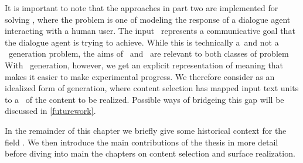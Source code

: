 It is important to note that the approaches in part two are implemented
for solving \taskorienteddialoguegeneration, where
the problem is one of modeling the response of a dialogue agent interacting
with a human user. The input \meaningrepresentation~represents a communicative
goal that the dialogue agent is trying to achieve. While this is technically
a\datatotext~and not a \texttotext~generation problem, the aims
of \faithful~and \controllablegeneration~are relevant to both classes of 
problem
With \datatotext~generation, however, we
get an explicit representation of meaning that makes it easier to make 
experimental progress. We therefore consider 
\taskorienteddialoguegeneration as an idealized form of \texttotext generation,
where content selection has mapped input text units to a 
\meaningrepresentation~of the content to be realized.
Possible ways of bridgeing this gap will be discussed in \autoref{futurework}.

In the remainder of this chapter we briefly give some historical context
for the field \naturallanguagegeneration. 
We then introduce the main contributions of the thesis in more detail
before diving into main the chapters on content selection and surface 
realization. 



